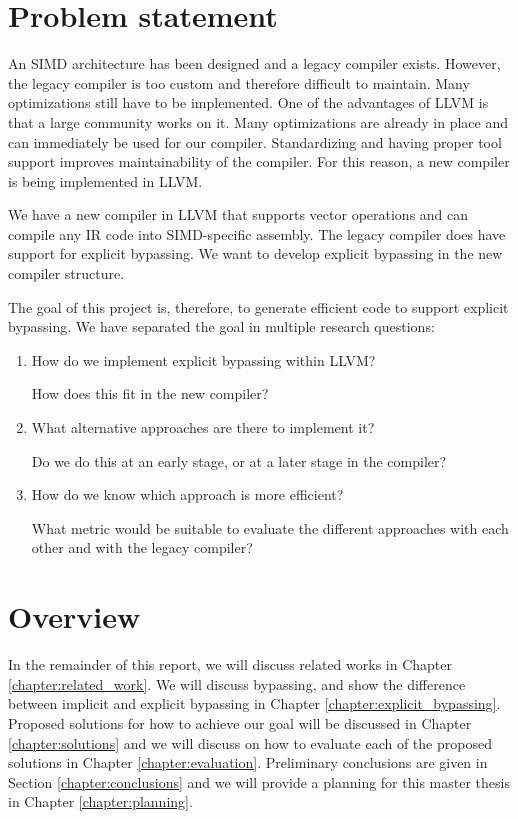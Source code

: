\section{Problem statement}\label{sec:problem_statement}
An SIMD architecture has been designed and a legacy compiler exists. However, the legacy compiler is too custom and therefore difficult to maintain. Many optimizations still have to be implemented. One of the advantages of LLVM is that a large community works on it. Many optimizations are already in place and can immediately be used for our compiler. Standardizing and having proper tool support improves maintainability of the compiler. %
For this reason, a new compiler is being implemented in LLVM.

We have a new compiler in LLVM that supports vector operations and can compile any IR code into SIMD-specific assembly. The legacy compiler does have support for explicit bypassing. We want to develop explicit bypassing in the new compiler structure.

The goal of this project is, therefore, to generate efficient code to support explicit bypassing. We have separated the goal in multiple research questions:

\begin{enumerate}
\item How do we implement explicit bypassing within LLVM?

How does this fit in the new compiler?
\item What alternative approaches are there to implement it?

Do we do this at an early stage, or at a later stage in the compiler?
\item How do we know which approach is more efficient?

What metric would be suitable to evaluate the different approaches with each other and with the legacy compiler?
\end{enumerate}





\section{Overview}\label{sec:overview}
In the remainder of this report, we will discuss related works in Chapter \ref{chapter:related_work}. We will discuss bypassing, and show the difference between implicit and explicit bypassing in Chapter \ref{chapter:explicit_bypassing}. Proposed solutions for how to achieve our goal will be discussed in Chapter \ref{chapter:solutions} and we will discuss on how to evaluate each of the proposed solutions in Chapter \ref{chapter:evaluation}. Preliminary conclusions are given in Section \ref{chapter:conclusions} and we will provide a planning for this master thesis in Chapter \ref{chapter:planning}.